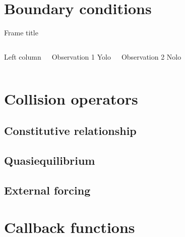 \documentclass[pdf]{beamer}
\begin{document}
\section{Boundary conditions}

\begin{frame}{Frame title}
  \begin{columns}
    Left column
    \begin{block}{Observation 1}
      Yolo
    \end{block}
    \begin{block}{Observation 2}
      Nolo
    \end{block}
  \end{columns}
\end{frame}

\section{Collision operators}

\subsection{Constitutive relationship}
\subsection{Quasiequilibrium}
\subsection{External forcing}
\section{Callback functions}
\end{document}
